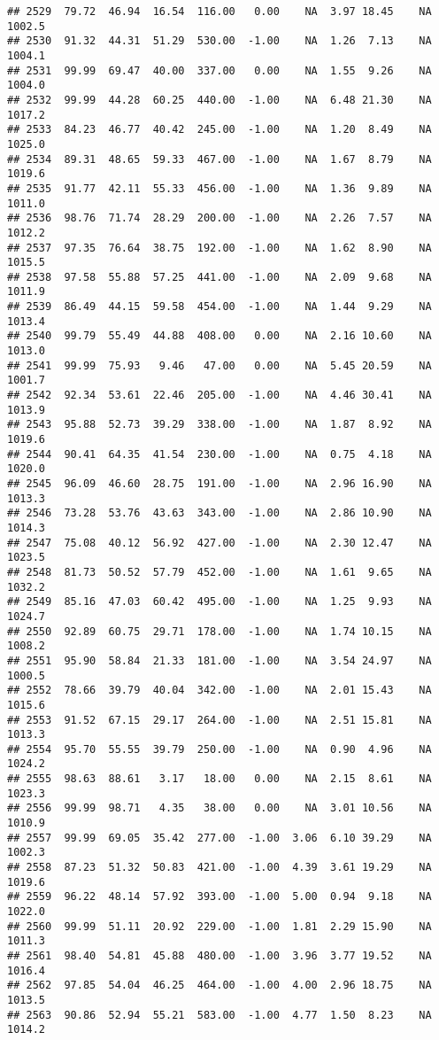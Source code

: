 \documentclass{article}\usepackage{graphicx, color}
\makeatletter
\newenvironment{kframe}{%
 \def\at@end@of@kframe{}%
 \ifinner\ifhmode%
  \def\at@end@of@kframe{\end{minipage}}%
  \begin{minipage}{\columnwidth}%
 \fi\fi%
 \def\FrameCommand##1{\hskip\@totalleftmargin \hskip-\fboxsep
 \colorbox{shadecolor}{##1}\hskip-\fboxsep
     \hskip-\linewidth \hskip-\@totalleftmargin \hskip\columnwidth}%
 \MakeFramed {\advance\hsize-\width
   \@totalleftmargin\z@ \linewidth\hsize
   \@setminipage}}%
 {\par\unskip\endMakeFramed%
 \at@end@of@kframe}
\newenvironment{knitrout}{}{} %
\makeatother
\begin{document}
\begin{knitrout}
\begin{kframe}
\begin{verbatim}
## 2529  79.72  46.94  16.54  116.00   0.00    NA  3.97 18.45    NA 1002.5
## 2530  91.32  44.31  51.29  530.00  -1.00    NA  1.26  7.13    NA 1004.1
## 2531  99.99  69.47  40.00  337.00   0.00    NA  1.55  9.26    NA 1004.0
## 2532  99.99  44.28  60.25  440.00  -1.00    NA  6.48 21.30    NA 1017.2
## 2533  84.23  46.77  40.42  245.00  -1.00    NA  1.20  8.49    NA 1025.0
## 2534  89.31  48.65  59.33  467.00  -1.00    NA  1.67  8.79    NA 1019.6
## 2535  91.77  42.11  55.33  456.00  -1.00    NA  1.36  9.89    NA 1011.0
## 2536  98.76  71.74  28.29  200.00  -1.00    NA  2.26  7.57    NA 1012.2
## 2537  97.35  76.64  38.75  192.00  -1.00    NA  1.62  8.90    NA 1015.5
## 2538  97.58  55.88  57.25  441.00  -1.00    NA  2.09  9.68    NA 1011.9
## 2539  86.49  44.15  59.58  454.00  -1.00    NA  1.44  9.29    NA 1013.4
## 2540  99.79  55.49  44.88  408.00   0.00    NA  2.16 10.60    NA 1013.0
## 2541  99.99  75.93   9.46   47.00   0.00    NA  5.45 20.59    NA 1001.7
## 2542  92.34  53.61  22.46  205.00  -1.00    NA  4.46 30.41    NA 1013.9
## 2543  95.88  52.73  39.29  338.00  -1.00    NA  1.87  8.92    NA 1019.6
## 2544  90.41  64.35  41.54  230.00  -1.00    NA  0.75  4.18    NA 1020.0
## 2545  96.09  46.60  28.75  191.00  -1.00    NA  2.96 16.90    NA 1013.3
## 2546  73.28  53.76  43.63  343.00  -1.00    NA  2.86 10.90    NA 1014.3
## 2547  75.08  40.12  56.92  427.00  -1.00    NA  2.30 12.47    NA 1023.5
## 2548  81.73  50.52  57.79  452.00  -1.00    NA  1.61  9.65    NA 1032.2
## 2549  85.16  47.03  60.42  495.00  -1.00    NA  1.25  9.93    NA 1024.7
## 2550  92.89  60.75  29.71  178.00  -1.00    NA  1.74 10.15    NA 1008.2
## 2551  95.90  58.84  21.33  181.00  -1.00    NA  3.54 24.97    NA 1000.5
## 2552  78.66  39.79  40.04  342.00  -1.00    NA  2.01 15.43    NA 1015.6
## 2553  91.52  67.15  29.17  264.00  -1.00    NA  2.51 15.81    NA 1013.3
## 2554  95.70  55.55  39.79  250.00  -1.00    NA  0.90  4.96    NA 1024.2
## 2555  98.63  88.61   3.17   18.00   0.00    NA  2.15  8.61    NA 1023.3
## 2556  99.99  98.71   4.35   38.00   0.00    NA  3.01 10.56    NA 1010.9
## 2557  99.99  69.05  35.42  277.00  -1.00  3.06  6.10 39.29    NA 1002.3
## 2558  87.23  51.32  50.83  421.00  -1.00  4.39  3.61 19.29    NA 1019.6
## 2559  96.22  48.14  57.92  393.00  -1.00  5.00  0.94  9.18    NA 1022.0
## 2560  99.99  51.11  20.92  229.00  -1.00  1.81  2.29 15.90    NA 1011.3
## 2561  98.40  54.81  45.88  480.00  -1.00  3.96  3.77 19.52    NA 1016.4
## 2562  97.85  54.04  46.25  464.00  -1.00  4.00  2.96 18.75    NA 1013.5
## 2563  90.86  52.94  55.21  583.00  -1.00  4.77  1.50  8.23    NA 1014.2

\end{verbatim}
\end{kframe}
\end{knitrout}
\end{document}
